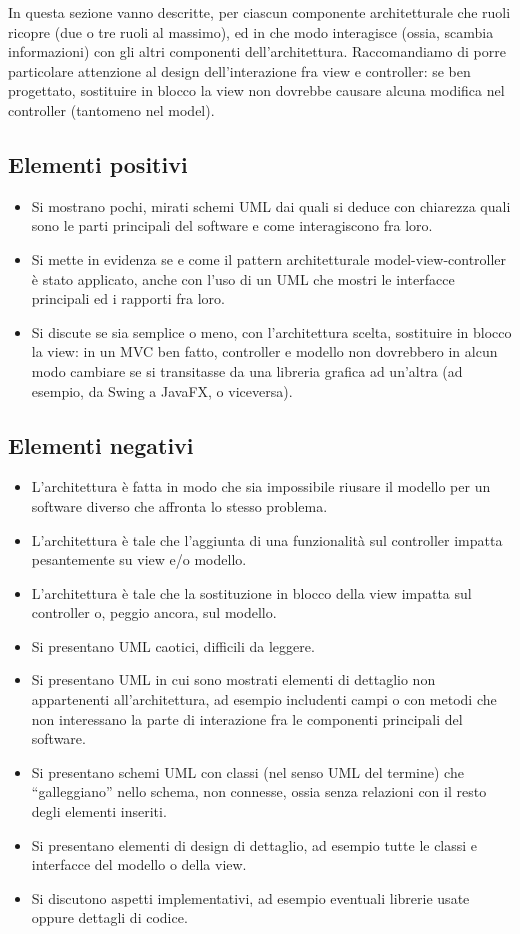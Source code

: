 \documentclass[a4paper,12pt]{report}
\begin{document}
In questa sezione vanno descritte, per ciascun componente architetturale che ruoli ricopre (due o tre ruoli al massimo), ed in che modo interagisce (ossia, scambia informazioni) con gli altri componenti dell'architettura.
%
Raccomandiamo di porre particolare attenzione al design dell'interazione fra view e controller: se ben progettato, sostituire in blocco la view non dovrebbe causare alcuna modifica nel controller (tantomeno nel model).

\subsection*{Elementi positivi}
\begin{itemize}
 \item Si mostrano pochi, mirati schemi UML dai quali si deduce con chiarezza quali sono le parti principali del software e come interagiscono fra loro.
 \item Si mette in evidenza se e come il pattern architetturale model-view-controller è stato applicato, anche con l'uso di un UML che mostri le interfacce principali ed i rapporti fra loro.
 \item Si discute se sia semplice o meno, con l'architettura scelta, sostituire in blocco la view: in un MVC ben fatto, controller e modello non dovrebbero in alcun modo cambiare se si transitasse da una libreria grafica ad un'altra (ad esempio, da Swing a JavaFX, o viceversa).
\end{itemize}

\subsection*{Elementi negativi}
\begin{itemize}
 \item L'architettura è fatta in modo che sia impossibile riusare il modello per un software diverso che affronta lo stesso problema.
 \item L'architettura è tale che l'aggiunta di una funzionalità sul controller impatta pesantemente su view e/o modello.
 \item L'architettura è tale che la sostituzione in blocco della view impatta sul controller o, peggio ancora, sul modello.
 \item Si presentano UML caotici, difficili da leggere.
 \item Si presentano UML in cui sono mostrati elementi di dettaglio non appartenenti all'architettura, ad esempio includenti campi o con metodi che non interessano la parte di interazione fra le componenti principali del software.
 \item Si presentano schemi UML con classi (nel senso UML del termine) che ``galleggiano'' nello schema, non connesse, ossia senza relazioni con il resto degli elementi inseriti.
 \item Si presentano elementi di design di dettaglio, ad esempio tutte le classi e interfacce del modello o della view.
 \item Si discutono aspetti implementativi, ad esempio eventuali librerie usate oppure dettagli di codice.
\end{itemize}
\end{document}
